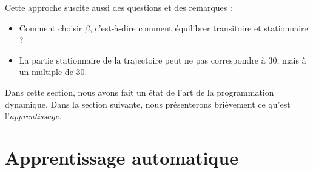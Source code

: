 Cette approche suscite aussi des questions et des remarques : 
\begin{itemize}[label=$\square$]
	\item	Comment choisir $\beta$, c'est-à-dire comment équilibrer transitoire et stationnaire ?
	\item	La partie stationnaire de la trajectoire peut ne pas correspondre à 30, mais à un multiple de 30.
\end{itemize}

Dans cette section, nous avons fait un état de l'art de la programmation dynamique. Dans la section suivante, nous présenterons brièvement ce qu'est l'\textit{apprentissage}. 


\section{Apprentissage automatique}

